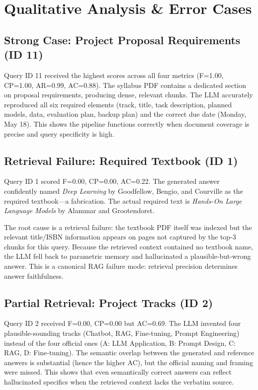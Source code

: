 \documentclass[11pt,a4paper]{article}
\begin{document}
\section{Qualitative Analysis \& Error Cases}

\subsection{Strong Case: Project Proposal Requirements (ID 11)}

Query ID 11 received the highest scores across all four metrics
(F=1.00, CP=1.00, AR=0.99, AC=0.88).  The syllabus PDF contains a dedicated
section on proposal requirements, producing dense, relevant chunks.  The LLM
accurately reproduced all six required elements (track, title, task description,
planned models, data, evaluation plan, backup plan) and the correct due date
(Monday, May 18).  This shows the pipeline functions correctly when document
coverage is precise and query specificity is high.

\subsection{Retrieval Failure: Required Textbook (ID 1)}

Query ID 1 scored F=0.00, CP=0.00, AC=0.22.  The generated answer confidently
named \emph{Deep Learning} by Goodfellow, Bengio, and Courville as the required
textbook---a fabrication.  The actual required text is \emph{Hands-On Large
Language Models} by Alammar and Grootendorst.

The root cause is a retrieval failure: the textbook PDF itself was indexed but
the relevant title/ISBN information appears on pages not captured by the top-3
chunks for this query.  Because the retrieved context contained no textbook name,
the LLM fell back to parametric memory and hallucinated a plausible-but-wrong
answer.  This is a canonical RAG failure mode: retrieval precision determines
answer faithfulness.

\subsection{Partial Retrieval: Project Tracks (ID 2)}

Query ID 2 received F=0.00, CP=0.00 but AC=0.69.  The LLM invented four
plausible-sounding tracks (Chatbot, RAG, Fine-tuning, Prompt Engineering)
instead of the four official ones (A: LLM Application, B: Prompt Design, C: RAG,
D: Fine-tuning).  The semantic overlap between the generated and reference answers
is substantial (hence the higher AC), but the official naming and framing were
missed.  This shows that even semantically correct answers can reflect
hallucinated specifics when the retrieved context lacks the verbatim source.
\end{document}
